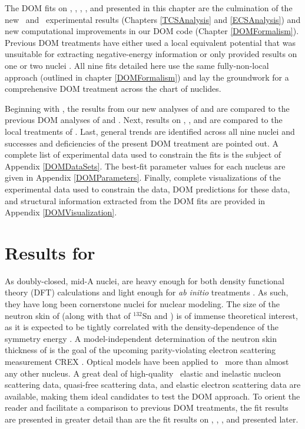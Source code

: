 The \gls{DOM} fits on \oSixEight, \caAughtEight, \niEightFour,
\snTwelveFour, and \pbEight presented in
this chapter are the culmination of the new \tot\ and \el\ experimental results
(Chapters \ref{TCSAnalysis} and \ref{ECSAnalysis})
and new computational improvements in our DOM code (Chapter \ref{DOMFormalism}).
Previous DOM treatments have either used a
local equivalent potential \cite{Charity2006, Mueller2011} that was unsuitable for extracting
negative-energy information or only provided results on one or
two nuclei \cite{Mahzoon2017}. All nine fits detailed here use the same fully-non-local approach
(outlined in chapter \ref{DOMFormalism}) and lay the groundwork for a comprehensive DOM treatment 
across the chart of nuclides.

Beginning with \caForty, the results from our new analyses of
\caAughtEight and \pbEight are compared to the previous DOM analyses of \cite{MahzoonPhDThesis} and 
\cite{Atkinson2018}. Next, results on \oSixEight, \niEightFour, and \snTwelveFour are compared to
the local treatments of \cite{Charity2006, Mueller2011}. Last, general trends are identified across
all nine nuclei and successes and deficiencies of the present DOM treatment are pointed out.
A complete list of experimental data used to constrain the fits is the subject of Appendix
\ref{DOMDataSets}. The best-fit parameter values for each nucleus are given in Appendix
\ref{DOMParameters}. Finally, complete visualizations of the experimental data used to constrain
the data, DOM predictions for these data, and structural information extracted from the DOM fits are
provided in Appendix \ref{DOMVisualization}.

\section{Results for \caAughtEight}
As doubly-closed, mid-A nuclei, \caAughtEight are heavy enough for both density functional
theory (DFT) calculations \cite{Piekarewicz2012} and light enough for \textit{ab initio} 
treatments \cite{Hagen2016}. As such, they have long been cornerstone nuclei for
nuclear modeling. The size of the neutron skin of \caEight (along with that of $^{132}$Sn and
\pbEight) is of immense theoretical interest, as it is expected to be tightly correlated with the
density-dependence of the symmetry energy \cite{Fattoyev2012}. A model-independent determination
of the neutron skin thickness of \caEight is the goal of the upcoming parity-violating
electron scattering measurement CREX \cite{Horowitz2014}. Optical models have been applied to
\caAughtEight\ more than almost any other nucleus. A great deal of high-quality \caAughtEight\ 
elastic and inelastic nucleon scattering data, quasi-free scattering data, and elastic electron
scattering data are available, making them ideal candidates to test the DOM approach. To orient the
reader and facilitate a comparison to previous DOM treatments, the \caAughtEight fit results are
presented in greater detail than are the fit results on \oSixEight, \niEightFour,
\snTwelveFour, and \pbEight presented later.

